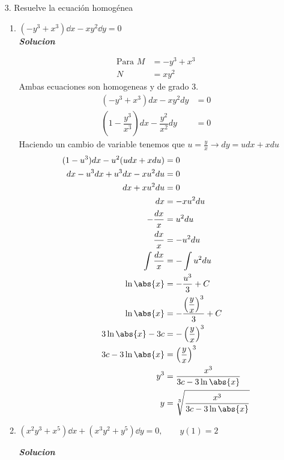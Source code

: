\begin{enumerate}
    \item[3.] Resuelve la ecuación homogénea 
\begin{enumerate}
    \item $(-y^{3}+x^{3}) \dd x - xy^{2} \dd y = 0$\\
    
\textit{ \textbf{Solucion}}
    
    \begin{align*}
        \text{Para } M &= -y^{3}+x^{3}\\
        N & = xy^{2}
    \end{align*}
Ambas ecuaciones son homogeneas y de grado 3.
\begin{align*}
    (-y^3+x^3)dx-xy^2dy & = 0\\ 
    \left(1-\dfrac{y^3}{x^3}\right)dx-\dfrac{y^2}{x^2}dy& = 0
\end{align*}
Haciendo un cambio de variable tenemos que $u=\frac{y}{x} \rightarrow dy = udx+xdu$
\allowdisplaybreaks
\begin{align*}
     (1-u^3)dx-u^2(udx+xdu)&=0\\ 
     dx-u^3dx+u^3dx-xu^2du&=0 \\ 
     dx+xu^2du&=0\\ 
     dx & = -xu^{2}du\\
     -\dfrac{dx}{x}&=u^2du\\ 
     \dfrac{dx}{x}&=-u^2du\\
     \int \dfrac{dx}{x}&=-\int u^{2}du\\ 
     \ln \abs{x}&=-\dfrac{u^3}{3}+C\\ 
     \ln \abs{x}&=-\dfrac{\left(\dfrac{y}{x}\right)^3}{3}+C\\ 
     3\ln \abs{x}-3c&=-\left(\frac{y}{x}\right)^3\\ 
     3c-3\ln \abs{x}&=\left(\frac{y}{x}\right)^3\\
     y^3&=\frac{x^3}{3c-3\ln \abs{x}}\\
     y&=\sqrt[3]{\frac{x^3}{3c-3\ln \abs{x}}}\\
\end{align*}
    \item $(x^{2}y^{3}+x^{5}) \dd x +(x^{3}y^{2}+y^{5}) \dd y = 0, \qquad y(1)= 2$
    
\textit{ \textbf{Solucion}}
    

\end{enumerate}
\end{enumerate}
